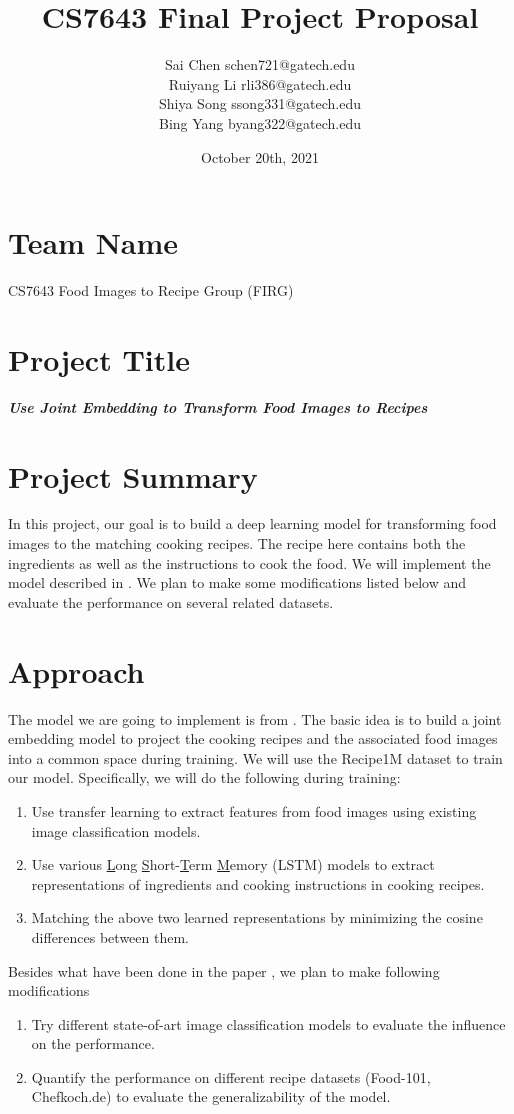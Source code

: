 \documentclass{article}
\title{CS7643 Final Project Proposal}
\author{Sai Chen schen721@gatech.edu \\
Ruiyang Li rli386@gatech.edu \\
Shiya Song ssong331@gatech.edu \\
Bing Yang byang322@gatech.edu}
\date{October 20th, 2021}
\begin{document}
\maketitle

\section{Team Name}
CS7643 Food Images to Recipe Group (FIRG)

\section{Project Title}
\textbf{\textit{Use Joint Embedding to Transform Food Images to Recipes}}

\section{Project Summary}
In this project, our goal is to build a deep learning model for transforming food images to the matching cooking recipes.  The recipe here contains both the ingredients as well as the instructions to cook the food.  We will implement the model described in \cite{salvador2017learning}.  We plan to make some modifications listed below and evaluate the performance on several related datasets.

\section{Approach}
The model we are going to implement is from \cite{salvador2017learning}.  The basic idea is to build a joint embedding model to project the cooking recipes and the associated food images into a common space during training.  We will use the Recipe1M dataset to train our model.  Specifically, we will do the following during training:
\begin{enumerate}
\item Use transfer learning to extract features from food images using existing image classification models.
\item Use various \underline{L}ong \underline{S}hort-\underline{T}erm \underline{M}emory (LSTM) models to extract representations of ingredients and cooking instructions in cooking recipes.
\item Matching the above two learned representations by minimizing the cosine differences between them.
\end{enumerate}
Besides what have been done in the paper \cite{salvador2017learning}, we plan to make following modifications
\begin{enumerate}
\item Try different state-of-art image classification models to evaluate the influence on the performance.
\item Quantify the performance on different recipe datasets (Food-101, Chefkoch.de) to evaluate the generalizability of the model.
\end{enumerate}
\end{document}
